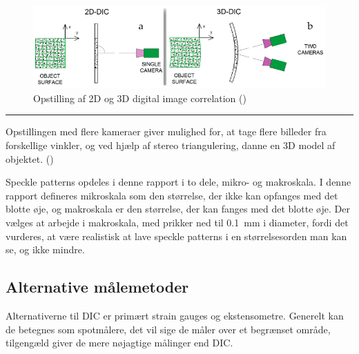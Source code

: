 \begin{figure}[H]
    \centering
    \includegraphics[width=0.9\linewidth]{Sections/2 Problemanalyse/Media/DIC 2D eller 3D.png}
    \caption{Opstilling af 2D og 3D digital image correlation (\cite{Wang2023FiberMonitoring})}
    \label{fig:2D og 3D DIC}
\end{figure} \plainbreak{-0.5}

Opstillingen med flere kameraer giver mulighed for, at tage flere billeder fra forskellige vinkler, og ved hjælp af stereo triangulering, danne en 3D model af objektet. (\cite{Byrne2020DigitalSoftware})


Speckle patterns opdeles i denne rapport i to dele, mikro- og makroskala. I denne rapport defineres mikroskala som den størrelse, der ikke kan opfanges med det blotte øje, og makroskala er den størrelse, der kan fanges med det blotte øje. Der vælges at arbejde i makroskala, med prikker ned til \SI{0,1}{mm} i diameter, fordi det vurderes, at være realistisk at lave speckle patterns i en størrelsesorden man kan se, og ikke mindre.





\subsection{Alternative målemetoder}
Alternativerne til DIC er primært strain gauges og ekstensometre. Generelt kan de betegnes som spotmålere, det vil sige de måler over et begrænset område, tilgengæld giver de mere nøjagtige målinger end DIC.

